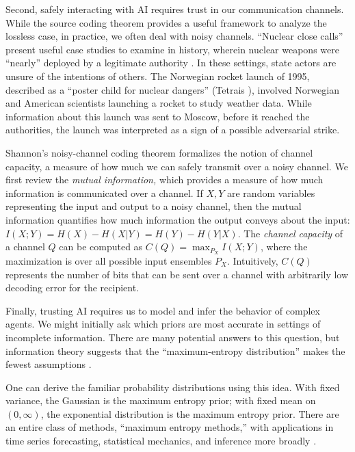 \documentclass[11pt]{article}
\begin{document}
Second, safely interacting with AI requires trust in our communication channels.  While the source coding theorem provides a useful framework to analyze the lossless case, in practice, we often deal with noisy channels.  ``Nuclear close calls'' present useful case studies to examine in history, wherein nuclear weapons were ``nearly'' deployed by a legitimate authority \cite{tertrais2017brink}.  In these settings, state actors are unsure of the intentions of others.  The Norwegian rocket launch of 1995, described as a ``poster child for nuclear dangers'' (Tetrais \cite{tertrais2017brink}), involved Norwegian and American scientists launching a rocket to study weather data.  While information about this launch was sent to Moscow, before it reached the authorities, the launch was interpreted as a sign of a possible adversarial strike.

Shannon's noisy-channel coding theorem formalizes the notion of channel capacity, a measure of how much we can safely transmit over a noisy channel.  We first review the {\it mutual information,} which provides a measure of how much information is communicated over a channel.  If $X, Y$ are random variables representing the input and output to a noisy channel, then the mutual information quantifies how much information the output conveys about the input: $I(X; Y) = H(X) - H(X | Y) = H(Y) - H(Y|X)$.  The {\it channel capacity} of a channel $Q$ can be computed as $C(Q) = \max_{P_X} I(X; Y)$, where the maximization is over all possible input ensembles $P_X$.  Intuitively, $C(Q)$ represents the number of bits that can be sent over a channel with arbitrarily low decoding error for the recipient.

Finally, trusting AI requires us to model and infer the behavior of complex agents.  We might initially ask which priors are most accurate in settings of incomplete information.  There are many potential answers to this question, but information theory suggests that the ``maximum-entropy distribution'' makes the fewest assumptions \cite{adi-maxent} \cite{mackay2003information}.  

One can derive the familiar probability distributions using this idea.  With fixed variance, the Gaussian is the maximum entropy prior; with fixed mean on $(0, \infty)$, the exponential distribution is the maximum entropy prior.  There are an entire class of methods, ``maximum entropy methods,'' with applications in time series forecasting, statistical mechanics, and inference more broadly \cite{jaynes1982rationale}\cite{jaynes2003probability}.
\end{document}
